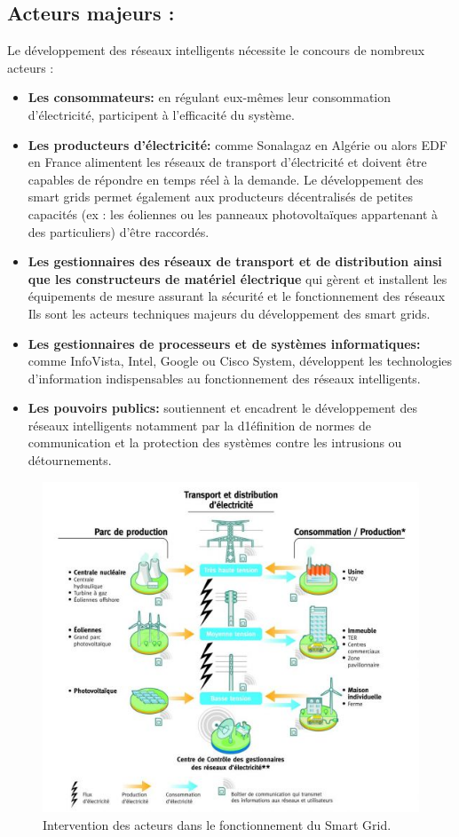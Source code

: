 \subsection{Acteurs majeurs :}
Le développement des réseaux intelligents nécessite le concours  de nombreux acteurs :

\begin{itemize}[label=\textbullet]
\item \textbf{Les consommateurs:} en régulant eux-mêmes leur consommation d’électricité, participent à l’efficacité du système.

\item \textbf{Les producteurs d’électricité:} comme Sonalagaz en Algérie ou alors EDF en France alimentent les réseaux de transport  d’électricité et doivent être capables de répondre en temps réel à la demande. Le développement des smart grids permet également aux producteurs décentralisés de petites capacités (ex : les éoliennes ou les panneaux photovoltaïques appartenant à des particuliers) d’être raccordés.

\item \textbf{Les gestionnaires des réseaux de transport et de distribution ainsi que les constructeurs de matériel électrique} qui gèrent et installent les équipements de mesure assurant la sécurité et le fonctionnement des réseaux Ils sont les acteurs techniques majeurs du développement des smart grids.

\item \textbf{Les gestionnaires de processeurs et de systèmes informatiques:} comme InfoVista, Intel, Google ou Cisco System, développent les technologies d’information indispensables au fonctionnement des réseaux intelligents.

\item \textbf{Les pouvoirs publics:} soutiennent et encadrent le développement des réseaux intelligents notamment par la d1éfinition de normes de communication et la protection des systèmes contre les intrusions ou détournements.
\end{itemize}

\begin{figure}[h]
	\centering
    \includegraphics[scale=0.6]{img/part2/1.3}
    \caption{Intervention des acteurs dans le fonctionnement du Smart Grid.}
\end{figure}
